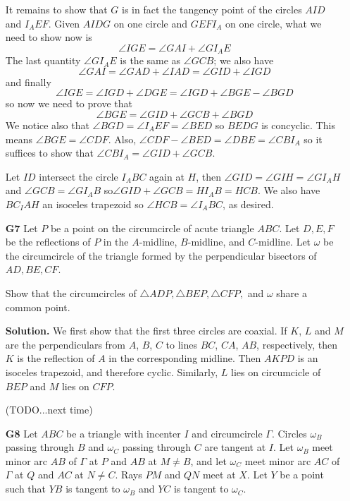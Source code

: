 \documentclass[11pt,a4paper]{article}
\begin{document}
\begin{enumerate}
	It remains to show that $G$ is in fact the tangency point of the circles $AID$ and $I_AEF$. Given $AIDG$ on one circle and $GEFI_A$ on one circle, what we need to show now is 
	\[
	\angle IGE = \angle GAI + \angle GI_AE
	\]
	The last quantity $\angle GI_AE$ is the same as $\angle GCB$; we also have 
	\[
	\angle GAI = \angle GAD+\angle IAD = \angle GID+\angle IGD 
	\]
	and finally 
	\[
	\angle IGE=\angle IGD+\angle DGE = \angle IGD+\angle BGE-\angle BGD 
	\]
	so now we need to prove that 
	\[
	\angle BGE=\angle GID + \angle GCB + \angle BGD
	\]
	We notice also that $\angle BGD=\angle I_AEF = \angle BED$ so $BEDG$ is concyclic. This means $\angle BGE=\angle CDF$. 
	Also, $\angle CDF-\angle BED=\angle DBE=\angle CBI_A$ so it suffices to show that $\angle CBI_A=\angle GID+\angle GCB$. 
	
	Let $ID$ intersect the circle $I_ABC$ again at $H$, then $\angle GID=\angle GIH=\angle GI_AH$ and $\angle GCB=\angle GI_AB$ so$\angle GID+\angle GCB=HI_AB=HCB$. We also have $BC_IAH$ an isoceles trapezoid so $\angle HCB=\angle I_ABC$, as desired. 
	
	\item [\textbf{G7}] Let $P$ be a point on the circumcircle of acute triangle $ABC$. Let $D,E,F$ be the reflections of $P$ in the $A$-midline, $B$-midline, and $C$-midline. Let $\omega$ be the circumcircle of the triangle formed by the perpendicular bisectors of $AD, BE, CF$.
	
	Show that the circumcircles of $\triangle ADP, \triangle BEP, \triangle CFP,$ and $\omega$ share a common point.
	
	\textbf{Solution.} We first show that the first three circles are coaxial. If $K$, $L$ and $M$ are the perpendiculars from $A$, $B$, $C$ to lines $BC$, $CA$, $AB$, respectively, then $K$ is the reflection of $A$ in the corresponding midline. Then $AKPD$ is an isoceles trapezoid, and therefore cyclic. 
	Similarly, $L$ lies on circumcicle of $BEP$ and $M$ lies on $CFP$. 
	
	(TODO...next time)
	
	\item [\textbf{G8}]
	Let $ABC$ be a triangle with incenter $I$ and circumcircle $\Gamma$. Circles $\omega_{B}$ passing through $B$ and $\omega_{C}$ passing through $C$ are tangent at $I$. Let $\omega_{B}$ meet minor arc $AB$ of $\Gamma$ at $P$ and $AB$ at $M\neq B$, and let $\omega_{C}$ meet minor arc $AC$ of $\Gamma$ at $Q$ and $AC$ at $N\neq C$. Rays $PM$ and $QN$ meet at $X$. Let $Y$ be a point such that $YB$ is tangent to $\omega_{B}$ and $YC$ is tangent to $\omega_{C}$.
	


\end{enumerate}
\end{document}
